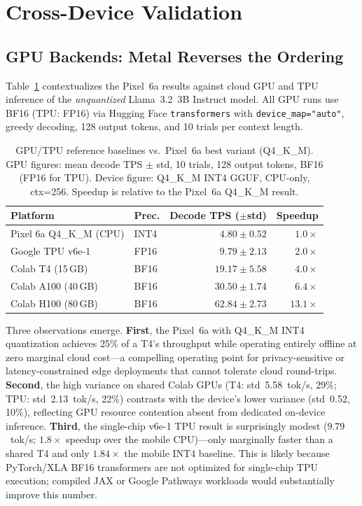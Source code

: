\documentclass[conference]{IEEEtran}
\begin{document}
\section{Cross-Device Validation}
\label{sec:crossdevice}

\subsection{GPU Backends: Metal Reverses the Ordering}
\label{sec:gpu_baseline}

Table~\ref{tab:gpu_baseline} contextualizes the Pixel~6a results against cloud GPU
and TPU inference of the \emph{unquantized} Llama~3.2~3B Instruct model. All GPU
runs use BF16 (TPU: FP16) via Hugging Face \texttt{transformers} with
\texttt{device\_map="auto"}, greedy decoding, 128 output tokens, and 10 trials
per context length.

\begin{table}[h]
\centering
\caption{GPU/TPU reference baselines vs.\ Pixel~6a best variant (Q4\_K\_M).
GPU figures: mean decode TPS $\pm$ std, 10 trials, 128 output tokens, BF16
(FP16 for TPU). Device figure: Q4\_K\_M INT4 GGUF, CPU-only, ctx=256.
Speedup is relative to the Pixel~6a Q4\_K\_M result.}
\label{tab:gpu_baseline}
\setlength{\tabcolsep}{4pt}
\begin{tabular}{llrr}
\toprule
\textbf{Platform} & \textbf{Prec.} &
\textbf{Decode TPS ($\pm$std)} & \textbf{Speedup} \\
\midrule
Pixel 6a Q4\_K\_M (CPU) & INT4  & $4.80 \pm 0.52$ & $1.0\times$ \\
\midrule
Google TPU v6e-1        & FP16  & $9.79  \pm 2.13$ & $2.0\times$ \\
Colab T4 (15\,GB)       & BF16  & $19.17 \pm 5.58$ & $4.0\times$ \\
Colab A100 (40\,GB)     & BF16  & $30.50 \pm 1.74$ & $6.4\times$ \\
Colab H100 (80\,GB)     & BF16  & $62.84 \pm 2.73$ & $13.1\times$ \\
\bottomrule
\end{tabular}
\end{table}

Three observations emerge.
\textbf{First}, the Pixel~6a with Q4\_K\_M INT4 quantization achieves
25\% of a T4's throughput while operating entirely offline at zero marginal
cloud cost---a compelling operating point for privacy-sensitive or
latency-constrained edge deployments that cannot tolerate cloud round-trips.
\textbf{Second}, the high variance on shared Colab GPUs (T4: std~5.58~tok/s,
29\%; TPU: std~2.13~tok/s, 22\%) contrasts with the device's lower variance
(std~0.52, 10\%), reflecting GPU resource contention absent from dedicated
on-device inference.
\textbf{Third}, the single-chip v6e-1 TPU result is surprisingly modest
($9.79$~tok/s; $1.8\times$ speedup over the mobile CPU)---only marginally
faster than a shared T4 and only $1.84\times$ the mobile INT4 baseline.
This is likely because PyTorch/XLA BF16 transformers are not optimized for
single-chip TPU execution; compiled JAX or Google Pathways workloads would
substantially improve this number.
\end{document}

